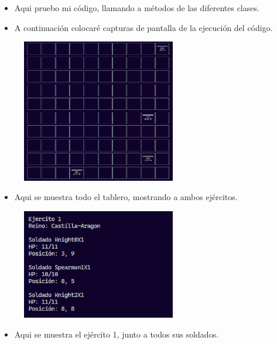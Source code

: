 \documentclass{article}
\begin{document}
	\begin{itemize}	
		\item Aqui pruebo mi código, llamando a métodos de las diferentes clases.
		\item A continuación colocaré capturas de pantalla de la ejecución del código.
	\end{itemize}
	
	\begin{figure}[H]
		\centering
	\includegraphics[width=0.6\textwidth,keepaspectratio]{img/tablero.png}
	\end{figure}
	\begin{itemize}	
		\item Aqui se muestra todo el tablero, mostrando a ambos ejércitos.
	\end{itemize}
	\begin{figure}[H]
		\centering
	\includegraphics[width=0.6\textwidth,keepaspectratio]{img/mostrar.png}
	\end{figure}
	\begin{itemize}	
		\item Aqui se muestra el ejército 1, junto a todos sus soldados.
	\end{itemize}
\end{document}
